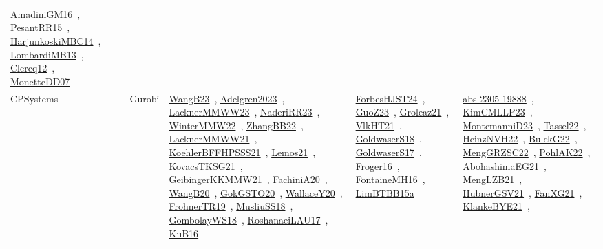{\begin{longtable}{lp{3cm}>{\raggedright\arraybackslash}p{6cm}>{\raggedright\arraybackslash}p{6cm}>{\raggedright\arraybackslash}p{8cm}}
\href{../works/AmadiniGM16.pdf}{AmadiniGM16}~\cite{AmadiniGM16}, \href{../works/PesantRR15.pdf}{PesantRR15}~\cite{PesantRR15}, \href{../works/HarjunkoskiMBC14.pdf}{HarjunkoskiMBC14}~\cite{HarjunkoskiMBC14}, \href{../works/LombardiMB13.pdf}{LombardiMB13}~\cite{LombardiMB13}, \href{../works/Clercq12.pdf}{Clercq12}~\cite{Clercq12}, \href{../works/MonetteDD07.pdf}{MonetteDD07}~\cite{MonetteDD07}\\
\index{Gurobi}\index{CPSystems!Gurobi}CPSystems & Gurobi & \href{../works/WangB23.pdf}{WangB23}~\cite{WangB23}, \href{../works/Adelgren2023.pdf}{Adelgren2023}~\cite{Adelgren2023}, \href{../works/LacknerMMWW23.pdf}{LacknerMMWW23}~\cite{LacknerMMWW23}, \href{../works/NaderiRR23.pdf}{NaderiRR23}~\cite{NaderiRR23}, \href{../works/WinterMMW22.pdf}{WinterMMW22}~\cite{WinterMMW22}, \href{../works/ZhangBB22.pdf}{ZhangBB22}~\cite{ZhangBB22}, \href{../works/LacknerMMWW21.pdf}{LacknerMMWW21}~\cite{LacknerMMWW21}, \href{../works/KoehlerBFFHPSSS21.pdf}{KoehlerBFFHPSSS21}~\cite{KoehlerBFFHPSSS21}, \href{../works/Lemos21.pdf}{Lemos21}~\cite{Lemos21}, \href{../works/KovacsTKSG21.pdf}{KovacsTKSG21}~\cite{KovacsTKSG21}, \href{../works/GeibingerKKMMW21.pdf}{GeibingerKKMMW21}~\cite{GeibingerKKMMW21}, \href{../works/FachiniA20.pdf}{FachiniA20}~\cite{FachiniA20}, \href{../works/WangB20.pdf}{WangB20}~\cite{WangB20}, \href{../works/GokGSTO20.pdf}{GokGSTO20}~\cite{GokGSTO20}, \href{../works/WallaceY20.pdf}{WallaceY20}~\cite{WallaceY20}, \href{../works/FrohnerTR19.pdf}{FrohnerTR19}~\cite{FrohnerTR19}, \href{../works/MusliuSS18.pdf}{MusliuSS18}~\cite{MusliuSS18}, \href{../works/GombolayWS18.pdf}{GombolayWS18}~\cite{GombolayWS18}, \href{../works/RoshanaeiLAU17.pdf}{RoshanaeiLAU17}~\cite{RoshanaeiLAU17}, \href{../works/KuB16.pdf}{KuB16}~\cite{KuB16} & \href{../works/ForbesHJST24.pdf}{ForbesHJST24}~\cite{ForbesHJST24}, \href{../works/GuoZ23.pdf}{GuoZ23}~\cite{GuoZ23}, \href{../works/Groleaz21.pdf}{Groleaz21}~\cite{Groleaz21}, \href{../works/VlkHT21.pdf}{VlkHT21}~\cite{VlkHT21}, \href{../works/GoldwaserS18.pdf}{GoldwaserS18}~\cite{GoldwaserS18}, \href{../works/GoldwaserS17.pdf}{GoldwaserS17}~\cite{GoldwaserS17}, \href{../works/Froger16.pdf}{Froger16}~\cite{Froger16}, \href{../works/FontaineMH16.pdf}{FontaineMH16}~\cite{FontaineMH16}, \href{../works/LimBTBB15a.pdf}{LimBTBB15a}~\cite{LimBTBB15a} & \href{../works/abs-2305-19888.pdf}{abs-2305-19888}~\cite{abs-2305-19888}, \href{../works/KimCMLLP23.pdf}{KimCMLLP23}~\cite{KimCMLLP23}, \href{../works/MontemanniD23.pdf}{MontemanniD23}~\cite{MontemanniD23}, \href{../works/Tassel22.pdf}{Tassel22}~\cite{Tassel22}, \href{../works/HeinzNVH22.pdf}{HeinzNVH22}~\cite{HeinzNVH22}, \href{../works/BulckG22.pdf}{BulckG22}~\cite{BulckG22}, \href{../works/MengGRZSC22.pdf}{MengGRZSC22}~\cite{MengGRZSC22}, \href{../works/PohlAK22.pdf}{PohlAK22}~\cite{PohlAK22}, \href{../works/AbohashimaEG21.pdf}{AbohashimaEG21}~\cite{AbohashimaEG21}, \href{../works/MengLZB21.pdf}{MengLZB21}~\cite{MengLZB21}, \href{../works/HubnerGSV21.pdf}{HubnerGSV21}~\cite{HubnerGSV21}, \href{../works/FanXG21.pdf}{FanXG21}~\cite{FanXG21}, \href{../works/KlankeBYE21.pdf}{KlankeBYE21}~\cite{KlankeBYE21}, 
\end{longtable}}
